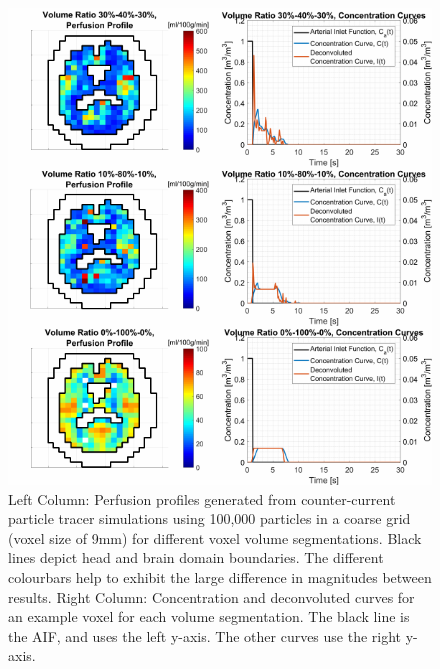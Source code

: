 \documentclass[11pt,english,a4paper,twoside,openright]{report}
\begin{document}
{{{{{{{\begin{figure}[p]
	\centering
	\includegraphics[width=\textwidth]{Chapter4/MonteCarloCounterCurrentResults}
	\caption[Perfusion profiles and concentration deconvolution curves from counter-current particle tracer simulations using 100,000 particles in a coarse grid for different voxel volume segmentations]{Left Column: Perfusion profiles generated from counter-current particle tracer simulations using 100,000 particles in a coarse grid (voxel size of 9mm) for different voxel volume segmentations. Black lines depict head and brain domain boundaries. The different colourbars help to exhibit the large difference in magnitudes between results. Right Column: Concentration and deconvoluted curves for an example voxel for each volume segmentation. The black line is the AIF, and uses the left y-axis. The other curves use the right y-axis.}
	\label{fig:CounterCurrentResults}
\end{figure}

}}}}}}}
\end{document}
